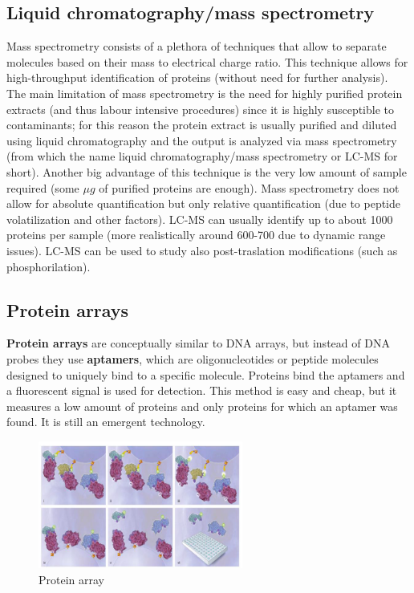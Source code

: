     \subsection{Liquid chromatography/mass spectrometry}
      Mass spectrometry consists of a plethora of techniques that allow to separate molecules based on their mass to electrical charge ratio. This technique allows for high-throughput identification of proteins (without need for further analysis). The main limitation of mass spectrometry is the need for highly purified protein extracts (and thus labour intensive procedures) since it is highly susceptible to contaminants; for this reason the protein extract is usually purified and diluted using liquid chromatography and the output is analyzed via mass spectrometry (from which the name liquid chromatography/mass spectrometry or LC-MS for short). Another big advantage of this technique is the very low amount of sample required (some $\mu g$ of purified proteins are enough). Mass spectrometry does not allow for absolute quantification but only relative quantification (due to peptide volatilization and other factors). LC-MS can usually identify up to about 1000 proteins per sample (more realistically around 600-700 due to dynamic range issues). LC-MS can be used to study also post-traslation modifications (such as phosphorilation).

    \subsection{Protein arrays}
      \textbf{Protein arrays} are conceptually similar to DNA arrays, but instead of DNA probes they use \textbf{aptamers}, which are oligonucleotides or peptide molecules designed to uniquely bind to a specific molecule. Proteins bind the aptamers and a fluorescent signal is used for detection. This method is easy and cheap, but it measures a low amount of proteins and only proteins for which an aptamer was found. It is still an emergent technology.

      \begin{figure}[ht]
      \caption{Protein array}
      \centering
      \includegraphics[width=0.6\textwidth]{ProteinArray}
      \end{figure}
    
